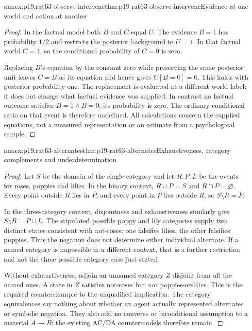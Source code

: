 \begin{annexitem}{annex:p19.rat63-observe-intervene}{thm:p19-rat63-observe-intervene}{Evidence at one world and action at another}
\begin{proof}
In the factual model both \(B\) and \(C\) equal \(U\).
The evidence \(B=1\) has probability \(1/2\) and restricts
the posterior background to \(U=1\). In that factual world
\(C=1\), so the conditional probability of \(C=0\) is zero.

Replacing \(B\)'s equation by the constant zero while preserving
the same posterior unit leaves \(C=B\) as its equation and hence
gives \(C[B=0]=0\). This holds with posterior probability one.
The replacement is evaluated at a different world label; it does
not change what factual evidence was supplied. In contrast no factual
outcome satisfies \(B=1\land B=0\); its probability is zero.
The ordinary conditional ratio on that event is therefore undefined.
All calculations concern the supplied equations, not a measured
representation or an estimate from a psychological sample.
\end{proof}
\end{annexitem}

\begin{annexitem}{annex:p19.rat63-alternates}{thm:p19-rat63-alternates}{Exhaustiveness, category complements and underdetermination}
\begin{proof}
Let \(S\) be the domain of the single category and let \(R,P,L\)
be the events for roses, poppies and lilies. In the binary context,
\(R\cup P=S\) and \(R\cap P=\varnothing\). Every point
outside \(R\) lies in \(P\), and every point in \(P\) lies
outside \(R\), so \(S\setminus R=P\).

In the three-category context, disjointness and exhaustiveness similarly
give \(S\setminus R=P\cup L\). The stipulated possible poppy
and lily categories supply two distinct states consistent with not-roses;
one falsifies lilies, the other falsifies poppies. Thus the negation
does not determine either individual alternate. If a named category
is impossible in a different context, that is a further restriction
and not the three-possible-category case just stated.

Without exhaustiveness, adjoin an unnamed category \(Z\) disjoint
from all the named ones. A state in \(Z\) satisfies not-roses but
not poppies-or-lilies. This is the required counterexample to the
unqualified implication. The category equivalences say nothing about
whether an agent actually represented alternates or symbolic negation.
They also add no converse or biconditional assumption to a material
\(A\to B\); the existing AC/DA countermodels therefore remain.
\end{proof}
\end{annexitem}
